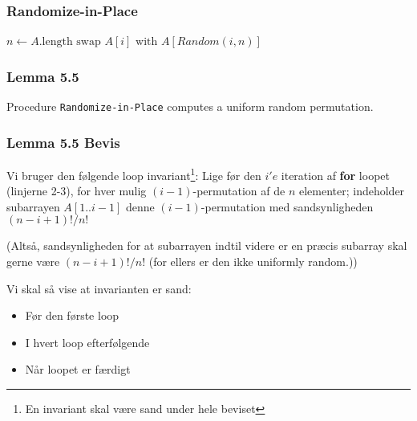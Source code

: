 \documentclass{beamer}
\begin{document}
\begin{frame}
  \frametitle{Randomize-in-Place}
  \begin{algorithmic}[1]
      \State $n \gets A.\text{length}$
      \State $\text{swap }A[i]\text{ with }A[Random(i,n)] $
      \EndFor
    \end{algorithmic}
\end{frame}

\begin{frame}
  \frametitle{Lemma 5.5}

  \begin{lemma}[Lemma 5.5]
    Procedure \texttt{Randomize-in-Place} computes a uniform random permutation.
  \end{lemma}
\end{frame}

\begin{frame}[allowframebreaks]
  \frametitle{Lemma 5.5 Bevis}

  Vi bruger den følgende loop invariant\footnote{En invariant skal være sand under hele beviset}:
 Lige før den $i'e$  iteration af \textbf{for} loopet (linjerne 2-3), for hver mulig $(i-1)$-permutation af de $n$ elementer; indeholder subarrayen $A[1..i-1]$ denne $(i-1)$-permutation med sandsynligheden $(n-i+1)!/n!$

 (Altså, sandsynligheden for at subarrayen indtil videre er en præcis subarray skal gerne være $(n-i+1)!/n!$ (for ellers er den ikke uniformly random.))

 Vi skal så vise at invarianten er sand:
 \begin{itemize}
 \item Før den første loop
 \item I hvert loop efterfølgende
 \item Når loopet er færdigt
 \end{itemize}
\end{frame}
\end{document}
